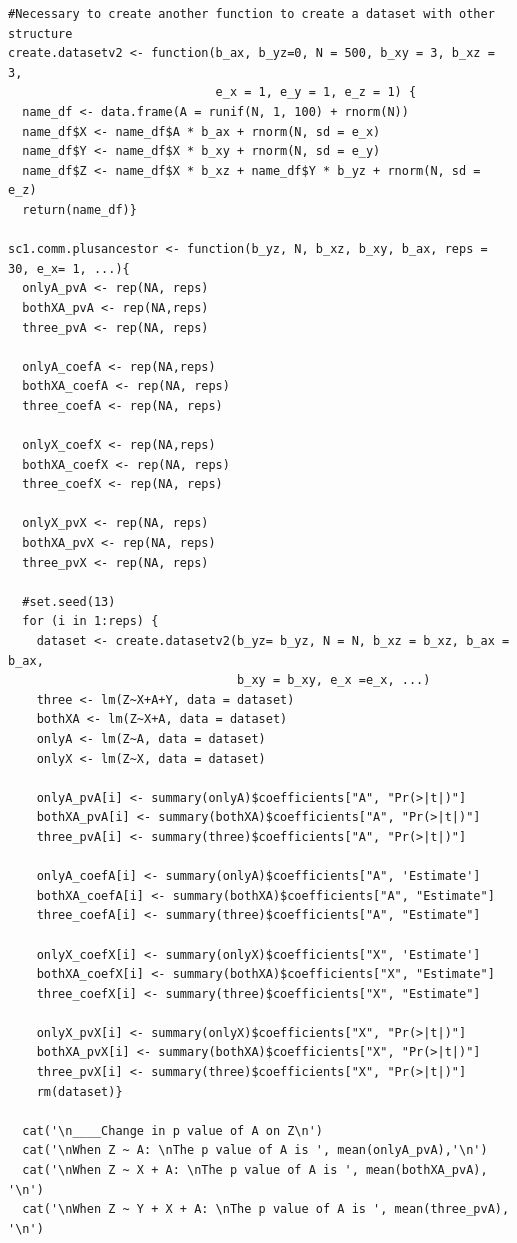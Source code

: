 \documentclass{article}
\begin{document}
\begin{lstlisting}
#Necessary to create another function to create a dataset with other structure
create.datasetv2 <- function(b_ax, b_yz=0, N = 500, b_xy = 3, b_xz = 3,
                             e_x = 1, e_y = 1, e_z = 1) {
  name_df <- data.frame(A = runif(N, 1, 100) + rnorm(N))
  name_df$X <- name_df$A * b_ax + rnorm(N, sd = e_x)
  name_df$Y <- name_df$X * b_xy + rnorm(N, sd = e_y)
  name_df$Z <- name_df$X * b_xz + name_df$Y * b_yz + rnorm(N, sd = e_z)
  return(name_df)}
  
sc1.comm.plusancestor <- function(b_yz, N, b_xz, b_xy, b_ax, reps = 30, e_x= 1, ...){
  onlyA_pvA <- rep(NA, reps)
  bothXA_pvA <- rep(NA,reps)
  three_pvA <- rep(NA, reps)
  
  onlyA_coefA <- rep(NA,reps)
  bothXA_coefA <- rep(NA, reps)
  three_coefA <- rep(NA, reps)
  
  onlyX_coefX <- rep(NA,reps)
  bothXA_coefX <- rep(NA, reps)
  three_coefX <- rep(NA, reps)
  
  onlyX_pvX <- rep(NA, reps)
  bothXA_pvX <- rep(NA, reps)
  three_pvX <- rep(NA, reps)
  
  #set.seed(13)
  for (i in 1:reps) {
    dataset <- create.datasetv2(b_yz= b_yz, N = N, b_xz = b_xz, b_ax = b_ax,
                                b_xy = b_xy, e_x =e_x, ...)
    three <- lm(Z~X+A+Y, data = dataset)
    bothXA <- lm(Z~X+A, data = dataset)
    onlyA <- lm(Z~A, data = dataset)
    onlyX <- lm(Z~X, data = dataset)
    
    onlyA_pvA[i] <- summary(onlyA)$coefficients["A", "Pr(>|t|)"]
    bothXA_pvA[i] <- summary(bothXA)$coefficients["A", "Pr(>|t|)"]
    three_pvA[i] <- summary(three)$coefficients["A", "Pr(>|t|)"]
    
    onlyA_coefA[i] <- summary(onlyA)$coefficients["A", 'Estimate']
    bothXA_coefA[i] <- summary(bothXA)$coefficients["A", "Estimate"]
    three_coefA[i] <- summary(three)$coefficients["A", "Estimate"]
    
    onlyX_coefX[i] <- summary(onlyX)$coefficients["X", 'Estimate']
    bothXA_coefX[i] <- summary(bothXA)$coefficients["X", "Estimate"]
    three_coefX[i] <- summary(three)$coefficients["X", "Estimate"]
    
    onlyX_pvX[i] <- summary(onlyX)$coefficients["X", "Pr(>|t|)"]
    bothXA_pvX[i] <- summary(bothXA)$coefficients["X", "Pr(>|t|)"]
    three_pvX[i] <- summary(three)$coefficients["X", "Pr(>|t|)"]
    rm(dataset)}
  
  cat('\n____Change in p value of A on Z\n')
  cat('\nWhen Z ~ A: \nThe p value of A is ', mean(onlyA_pvA),'\n')
  cat('\nWhen Z ~ X + A: \nThe p value of A is ', mean(bothXA_pvA), '\n')
  cat('\nWhen Z ~ Y + X + A: \nThe p value of A is ', mean(three_pvA), '\n')


\end{lstlisting}
\end{document}
